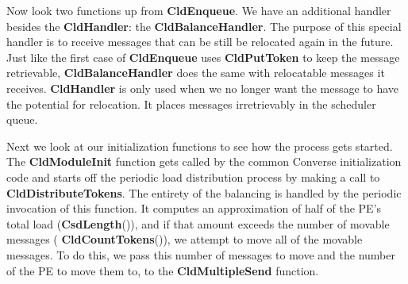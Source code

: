 Now look two functions up from {\bf CldEnqueue}.  We have an additional
handler besides the {\bf CldHandler}: the {\bf CldBalanceHandler}.  The
purpose of this special handler is to receive messages that can be still be
relocated again in the future.  Just like the first case of {\bf CldEnqueue}
uses {\bf CldPutToken} to keep the message retrievable, {\bf
CldBalanceHandler} does the same with relocatable messages it receives.
{\bf CldHandler} is only used when we no
longer want the message to have the potential for relocation.  It
places messages irretrievably in the scheduler queue.

Next we look at our initialization functions to see how the process
gets started.  The {\bf CldModuleInit} function gets called by the
common Converse initialization code and starts off the periodic load
distribution process by making a call to {\bf
CldDistributeTokens}. The entirety of the balancing is handled by the
periodic invocation of this function.  It computes an
approximation of half of the PE's total load ({\bf CsdLength}()), and if
that amount exceeds the number of movable messages ({\bf
CldCountTokens}()), we attempt to move all of the movable messages.
To do this, we pass this number of messages to move and the number of
the PE to move them to, to the {\bf CldMultipleSend} function.

